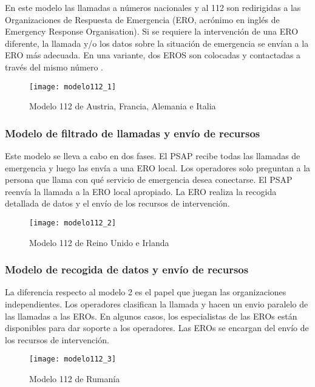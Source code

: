 En este modelo las llamadas a números nacionales y al 112 son redirigidas a las  Organizaciones de Respuesta de Emergencia (ERO, acrónimo en inglés de Emergency Response Organisation). Si se requiere la intervención de una ERO diferente, la llamada y/o los datos sobre la situación de emergencia se envían a la ERO más adecuada. En una variante, dos EROS son colocadas y contactadas a través del mismo número \cite{eena3}.

\begin{figure}[htp!]
  \centering
  \texttt{[image: modelo112\_1]}
  \caption{Modelo 112 de Austria, Francia, Alemania e Italia}
  \label{fig:modelo112_1}
\end{figure}

\subsubsection{Modelo de filtrado de llamadas y envío de recursos}

Este modelo se lleva a cabo en dos fases. El PSAP recibe todas las llamadas de emergencia y luego las envía a una ERO local. Los operadores solo preguntan a la persona que llama con qué servicio de emergencia desea conectarse. El PSAP reenvía la llamada a la ERO local apropiado. La ERO realiza la recogida detallada de datos y el envío de los recursos de intervención.

\begin{figure}[htp!]
  \centering
  \texttt{[image: modelo112\_2]}
  \caption{Modelo 112 de Reino Unido e Irlanda}
  \label{fig:modelo112_2}
\end{figure}

\subsubsection{Modelo de recogida de datos y envío de recursos}

La diferencia respecto al modelo 2 es el papel que juegan las organizaciones independientes. Los operadores clasifican la llamada y hacen un envio paralelo de las llamadas a las EROs. En algunos casos, los especialistas de las EROs están disponibles para dar soporte a los operadores. Las EROs se encargan del envío de los recursos de intervención.

\begin{figure}[htp!]
  \centering
  \texttt{[image: modelo112\_3]}
  \caption{Modelo 112 de Rumanía}
  \label{fig:modelo112_3}
\end{figure}

